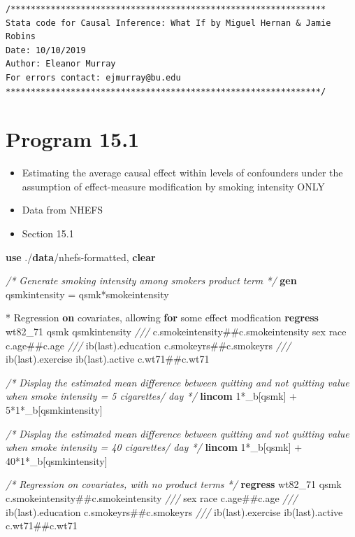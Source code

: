 \documentclass[
  10pt,
]{book}
\newenvironment{Shaded}{\begin{snugshade}}{\end{snugshade}}
\newcommand{\CommentTok}[1]{\textcolor[rgb]{0.56,0.35,0.01}{\textit{#1}}}
\newcommand{\FunctionTok}[1]{\textcolor[rgb]{0.00,0.00,0.00}{#1}}
\newcommand{\KeywordTok}[1]{\textcolor[rgb]{0.13,0.29,0.53}{\textbf{#1}}}
\newcommand{\NormalTok}[1]{#1}
\providecommand{\tightlist}{%
  \setlength{\itemsep}{0pt}\setlength{\parskip}{0pt}}
\begin{document}
\begin{verbatim}
/***************************************************************
Stata code for Causal Inference: What If by Miguel Hernan & Jamie Robins
Date: 10/10/2019
Author: Eleanor Murray 
For errors contact: ejmurray@bu.edu
***************************************************************/
\end{verbatim}

\hypertarget{program-15.1}{%
\section{Program 15.1}\label{program-15.1}}

\begin{itemize}
\tightlist
\item
  Estimating the average causal effect within levels of confounders under the assumption of effect-measure modification by smoking intensity ONLY
\item
  Data from NHEFS
\item
  Section 15.1
\end{itemize}

\begin{Shaded}
\begin{Highlighting}[]
\KeywordTok{use}\NormalTok{ ./}\KeywordTok{data}\NormalTok{/nhefs-formatted, }\KeywordTok{clear}

\CommentTok{/* Generate smoking intensity among smokers product term */}
\KeywordTok{gen}\NormalTok{ qsmkintensity = qsmk*smokeintensity}

\NormalTok{* Regression }\KeywordTok{on}\NormalTok{ covariates, allowing }\KeywordTok{for}\NormalTok{ some effect modfication}
\KeywordTok{regress}\NormalTok{ wt82_71 qsmk qsmkintensity }\CommentTok{///}
\NormalTok{  c.smokeintensity##c.smokeintensity sex race c.age##c.age }\CommentTok{///}
\NormalTok{  ib(}\FunctionTok{last}\NormalTok{).education c.smokeyrs##c.smokeyrs }\CommentTok{///}
\NormalTok{  ib(}\FunctionTok{last}\NormalTok{).exercise ib(}\FunctionTok{last}\NormalTok{).active c.wt71##c.wt71 }

\CommentTok{/* Display the estimated mean difference between quitting and }
\CommentTok{  not quitting value when smoke intensity = 5 cigarettes/ day */}
\KeywordTok{lincom}\NormalTok{ 1*_b[qsmk] + 5*1*_b[qsmkintensity] }

\CommentTok{/* Display the estimated mean difference between quitting and }
\CommentTok{  not quitting value when smoke intensity = 40 cigarettes/ day */}
\KeywordTok{lincom}\NormalTok{ 1*_b[qsmk] + 40*1*_b[qsmkintensity]}

\CommentTok{/* Regression on covariates, with no product terms */}
\KeywordTok{regress}\NormalTok{ wt82_71 qsmk c.smokeintensity##c.smokeintensity }\CommentTok{///}
\NormalTok{  sex race c.age##c.age }\CommentTok{///}
\NormalTok{  ib(}\FunctionTok{last}\NormalTok{).education c.smokeyrs##c.smokeyrs }\CommentTok{///}
\NormalTok{  ib(}\FunctionTok{last}\NormalTok{).exercise ib(}\FunctionTok{last}\NormalTok{).active c.wt71##c.wt71 }
\end{Highlighting}
\end{Shaded}
\end{document}
